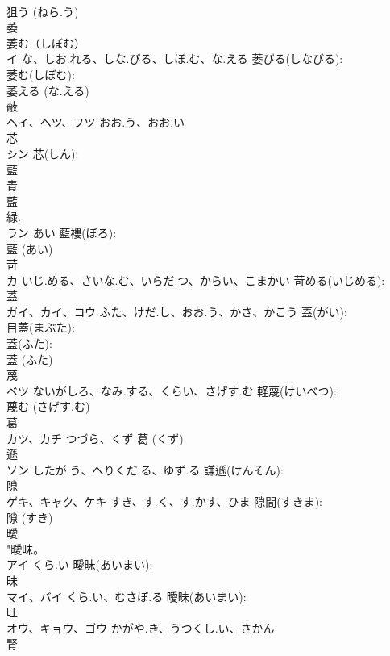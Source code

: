 \documentclass[8pt]{extreport}
\begin{document}
\begin{CJK}{UTF8}{min}
\\	狙う (ねら.う)
\\	萎			
\\	萎む（しぼむ）
\\	イ	な、しお.れる、しな.びる、しぼ.む、な.える	萎びる(しなびる): 
\\	萎む(しぼむ): 
\\	萎える (な.える)
\\	蔽			
\\	ヘイ、ヘツ、フツ	おお.う、おお.い		
\\	芯			
\\	シン		芯(しん): 
\\	藍			
\\	青 
\\	藍 
\\	緑. 
\\	ラン	あい	藍褸(ぼろ): 
\\	藍 (あい)
\\	苛			
\\	カ	いじ.める、さいな.む、いらだ.つ、からい、こまかい	苛める(いじめる): 
\\	蓋			
\\	ガイ、カイ、コウ	ふた、けだ.し、おお.う、かさ、かこう	蓋(がい): 
\\	目蓋(まぶた): 
\\	蓋(ふた): 
\\	蓋 (ふた)
\\	蔑			
\\	ベツ	ないがしろ、なみ.する、くらい、さげす.む	軽蔑(けいべつ): 
\\	蔑む (さげす.む)
\\	葛			
\\	カツ、カチ	つづら、くず		葛 (くず)
\\	遜			
\\	ソン	したが.う、へりくだ.る、ゆず.る	謙遜(けんそん): 
\\	隙			
\\	ゲキ、キャク、ケキ	すき、す.く、す.かす、ひま	隙間(すきま): 
\\	隙 (すき)
\\	曖			
\\	"曖昧。 
\\	アイ	くら.い	曖昧(あいまい): 
\\	昧			
\\	マイ、バイ	くら.い、むさぼ.る	曖昧(あいまい): 
\\	旺			
\\	オウ、キョウ、ゴウ	かがや.き、うつくし.い、さかん		
\\	腎			

\end{CJK}
\end{document}
